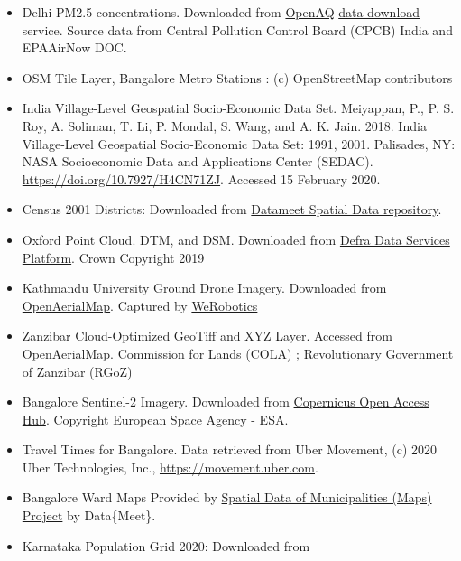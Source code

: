 \documentclass[
  12pt,
  a4paper]{article}
\providecommand{\tightlist}{%
  \setlength{\itemsep}{0pt}\setlength{\parskip}{0pt}}
\begin{document}
\begin{itemize}
\tightlist
\item
  Delhi PM2.5 concentrations. Downloaded from
  \href{https://openaq.org/}{OpenAQ}
  \href{https://openaq.org/\#/countries?_k=dmlk2k}{data download}
  service. Source data from Central Pollution Control Board (CPCB) India
  and EPAAirNow DOC.
\item
  OSM Tile Layer, Bangalore Metro Stations : (c) OpenStreetMap
  contributors
\item
  India Village-Level Geospatial Socio-Economic Data Set. Meiyappan, P.,
  P. S. Roy, A. Soliman, T. Li, P. Mondal, S. Wang, and A. K. Jain.
  2018. India Village-Level Geospatial Socio-Economic Data Set: 1991,
  2001. Palisades, NY: NASA Socioeconomic Data and Applications Center
  (SEDAC). \url{https://doi.org/10.7927/H4CN71ZJ}. Accessed 15 February
  2020.
\item
  Census 2001 Districts: Downloaded from
  \href{https://github.com/datameet/maps/tree/master/States}{Datameet
  Spatial Data repository}.
\item
  Oxford Point Cloud. DTM, and DSM. Downloaded from
  \href{https://environment.data.gov.uk/DefraDataDownload/}{Defra Data
  Services Platform}. Crown Copyright 2019
\item
  Kathmandu University Ground Drone Imagery. Downloaded from
  \href{https://map.openaerialmap.org/\#/85.53695037961006,27.61776421799196,20/user/59f0ecea31eff4000c3804fd/5a00c096bac48e5b1cf75232?_k=tkjpjw}{OpenAerialMap}.
  Captured by \href{https://werobotics.org/}{WeRobotics}
\item
  Zanzibar Cloud-Optimized GeoTiff and XYZ Layer. Accessed from
  \href{https://map.openaerialmap.org/\#/39.220848083496094,-6.162059582511514,11/user/5ac4842b26964b0010033104}{OpenAerialMap}.
  Commission for Lands (COLA) ; Revolutionary Government of Zanzibar
  (RGoZ)
\item
  Bangalore Sentinel-2 Imagery. Downloaded from
  \href{https://scihub.copernicus.eu/}{Copernicus Open Access Hub}.
  Copyright European Space Agency - ESA.
\item
  Travel Times for Bangalore. Data retrieved from Uber Movement, (c)
  2020 Uber Technologies, Inc., \url{https://movement.uber.com}.
\item
  Bangalore Ward Maps Provided by
  \href{http://projects.datameet.org/Municipal_Spatial_Data/}{Spatial
  Data of Municipalities (Maps) Project} by Data\{Meet\}.
\item
  Karnataka Population Grid 2020: Downloaded from

\end{itemize}
\end{document}
